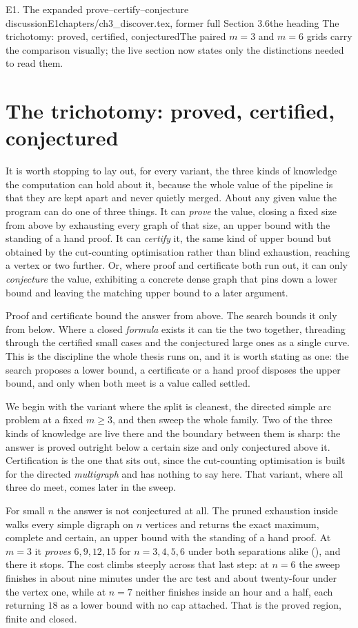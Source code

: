 \begin{offcut}{E1. The expanded prove--certify--conjecture discussion}{E1}{chapters/ch3\_discover.tex, former full Section 3.6}{the heading The trichotomy: proved, certified, conjectured}{The paired $m=3$ and $m=6$ grids carry the comparison visually; the live section now states only the distinctions needed to read them.}
\section{The trichotomy: proved, certified, conjectured}

It is worth stopping to lay out, for every variant, the three kinds of knowledge the computation can hold about it, because the whole value of the pipeline is that they are kept apart and never quietly merged. About any given value the program can do one of three things. It can \emph{prove} the value, closing a fixed size from above by exhausting every graph of that size, an upper bound with the standing of a hand proof. It can \emph{certify} it, the same kind of upper bound but obtained by the cut-counting optimisation rather than blind exhaustion, reaching a vertex or two further. Or, where proof and certificate both run out, it can only \emph{conjecture} the value, exhibiting a concrete dense graph that pins down a lower bound and leaving the matching upper bound to a later argument.

Proof and certificate bound the answer from above. The search bounds it only from below. Where a closed \emph{formula} exists it can tie the two together, threading through the certified small cases and the conjectured large ones as a single curve. This is the discipline the whole thesis runs on, and it is worth stating as one: the search proposes a lower bound, a certificate or a hand proof disposes the upper bound, and only when both meet is a value called settled.

We begin with the variant where the split is cleanest, the directed simple arc problem at a fixed $m \ge 3$, and then sweep the whole family. Two of the three kinds of knowledge are live there and the boundary between them is sharp: the answer is proved outright below a certain size and only conjectured above it. Certification is the one that sits out, since the cut-counting optimisation is built for the directed \emph{multigraph} and has nothing to say here. That variant, where all three do meet, comes later in the sweep.

For small $n$ the answer is not conjectured at all. The pruned exhaustion inside  walks every simple digraph on $n$ vertices and returns the exact maximum, complete and certain, an upper bound with the standing of a hand proof. At $m = 3$ it \emph{proves} $6, 9, 12, 15$ for $n = 3, 4, 5, 6$ under both separations alike (), and there it stops. The cost climbs steeply across that last step: at $n = 6$ the sweep finishes in about nine minutes under the arc test and about twenty-four under the vertex one, while at $n = 7$ neither finishes inside an hour and a half, each returning $18$ as a lower bound with no cap attached. That is the proved region, finite and closed.


\end{offcut}
